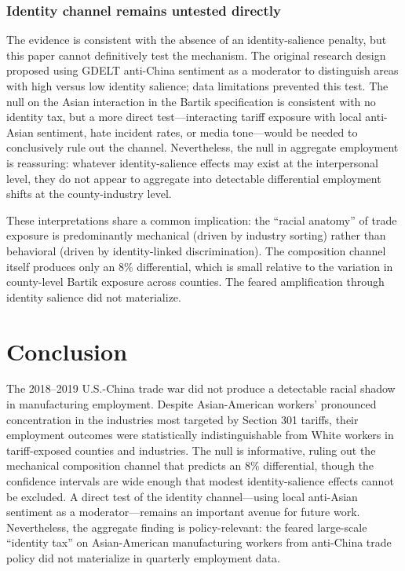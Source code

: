 \documentclass[12pt]{article}
\begin{document}
\subsubsection*{Identity channel remains untested directly} The evidence is consistent with the absence of an identity-salience penalty, but this paper cannot definitively test the mechanism. The original research design proposed using GDELT anti-China sentiment as a moderator to distinguish areas with high versus low identity salience; data limitations prevented this test. The null on the Asian interaction in the Bartik specification is consistent with no identity tax, but a more direct test---interacting tariff exposure with local anti-Asian sentiment, hate incident rates, or media tone---would be needed to conclusively rule out the channel. Nevertheless, the null in aggregate employment is reassuring: whatever identity-salience effects may exist at the interpersonal level, they do not appear to aggregate into detectable differential employment shifts at the county-industry level.

These interpretations share a common implication: the ``racial anatomy'' of trade exposure is predominantly mechanical (driven by industry sorting) rather than behavioral (driven by identity-linked discrimination). The composition channel itself produces only an 8\% differential, which is small relative to the variation in county-level Bartik exposure across counties. The feared amplification through identity salience did not materialize.


\section{Conclusion}\label{sec:conclusion}

The 2018--2019 U.S.-China trade war did not produce a detectable racial shadow in manufacturing employment. Despite Asian-American workers' pronounced concentration in the industries most targeted by Section 301 tariffs, their employment outcomes were statistically indistinguishable from White workers in tariff-exposed counties and industries. The null is informative, ruling out the mechanical composition channel that predicts an 8\% differential, though the confidence intervals are wide enough that modest identity-salience effects cannot be excluded. A direct test of the identity channel---using local anti-Asian sentiment as a moderator---remains an important avenue for future work. Nevertheless, the aggregate finding is policy-relevant: the feared large-scale ``identity tax'' on Asian-American manufacturing workers from anti-China trade policy did not materialize in quarterly employment data.
\end{document}
